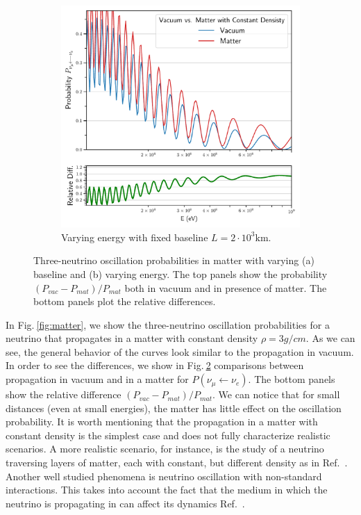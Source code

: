 \documentclass[twocolumn,secnumarabic,amssymb, nobibnotes, aps, prd,10pt]{revtex4-1}
\newcommand{\Fig}[1]{Fig.$\:$\ref{#1}}
\begin{document}
\begin{figure}
\begin{subfigure}{1.05\linewidth}
\includegraphics[width=\linewidth]{EngVacMatt.pdf}
\caption{Varying energy with fixed baseline $L=2 \cdot 10^3 \mathrm{km}$.} 
\label{fig:comparison} 
\end{subfigure}
\caption{Three-neutrino oscillation probabilities in matter with varying (a) baseline
and (b) varying energy. The top panels show the probability $\left( P_{vac} - P_{mat} 
\right) / P_{mat}$ both in vacuum and in presence of matter. The bottom panels plot
the relative differences.}
\end{figure}
In \Fig{fig:matter}, we show the three-neutrino oscillation probabilities for a neutrino
that propagates in a matter with constant density $\rho = 3 g/cm$. As we can see, the 
general behavior of the curves look similar to the propagation in vacuum. In order to
see the differences, we show in \Fig{fig:comparison} comparisons between propagation in
vacuum and in a matter for $P \left( \nu_\mu \longleftarrow \nu_e \right)$. The bottom
panels show the relative difference $\left( P_{vac} - P_{mat} \right) / P_{mat}$. We can
notice that for small distances (even at small energies), the matter has little effect
on the oscillation probability. It is worth mentioning that the propagation in a matter
with constant density is the simplest case and does not fully characterize realistic
scenarios. A more realistic scenario, for instance, is the study of a neutrino traversing
layers of matter, each with constant, but different density as in Ref.~\cite{Chizhov:1999az, 
Chizhov:1999he, Merfeld:2014cha}. Another well studied phenomena is neutrino oscillation 
with non-standard interactions. This takes into account the fact that the medium in which 
the neutrino is propagating in can affect its dynamics Ref.~\cite{Jacobsson:2001zk, Ohlsson:2003ip,
Arguelles:2012nw, Roe:2017zdw, Kelly:2018kmb}.
\end{document}
